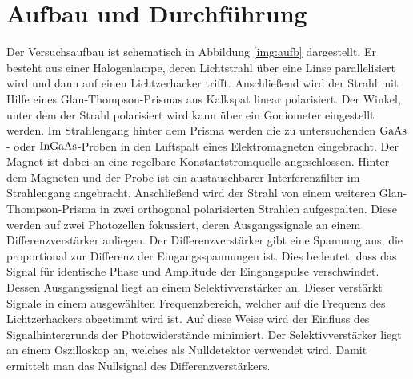 \section{Aufbau und Durchführung}

  
\noindent
Der Versuchsaufbau ist schematisch in Abbildung \ref{img:aufb} dargestellt. 
Er besteht aus einer Halogenlampe, deren Lichtstrahl über eine Linse parallelisiert wird und dann auf einen Lichtzerhacker trifft.
Anschließend wird der Strahl mit Hilfe eines Glan-Thompson-Prismas aus Kalkspat linear polarisiert. 
Der Winkel, unter dem der Strahl polarisiert wird kann über ein Goniometer eingestellt werden.
Im Strahlengang hinter dem Prisma werden die zu untersuchenden $\ce{GaAs}$- oder $\ce{InGaAs}$-Proben in den Luftspalt eines Elektromagneten eingebracht.
Der Magnet ist dabei an eine regelbare Konstantstromquelle angeschlossen. 
Hinter dem Magneten und der Probe ist ein austauschbarer Interferenzfilter im Strahlengang angebracht.
Anschließend wird der Strahl von einem weiteren Glan-Thompson-Prisma in zwei orthogonal polarisierten Strahlen aufgespalten. 
Diese werden auf zwei Photozellen fokussiert, deren Ausgangssignale an einem Differenzverstärker anliegen. 
Der Differenzverstärker gibt eine Spannung aus, die proportional zur Differenz der Eingangsspannungen ist. 
Dies bedeutet, dass das Signal für identische Phase und Amplitude der Eingangspulse verschwindet.\\
Dessen Ausgangssignal liegt an einem Selektivverstärker an. 
Dieser verstärkt Signale in einem ausgewählten Frequenzbereich, welcher auf die Frequenz des Lichtzerhackers abgetimmt wird ist.
Auf diese Weise wird der Einfluss des Signalhintergrunds der Photowiderstände minimiert. 
Der Selektivverstärker liegt an einem Oszilloskop an, welches als Nulldetektor verwendet wird. Damit ermittelt man das Nullsignal des Differenzverstärkers.\\





